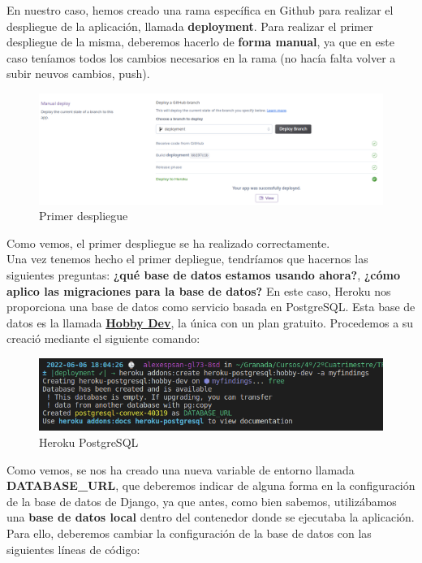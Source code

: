 En nuestro caso, hemos creado una rama específica en Github para realizar el despliegue de
la aplicación, llamada \textbf{deployment}. Para realizar el primer despliegue de la misma,
deberemos hacerlo de \textbf{forma manual}, ya que en este caso teníamos todos los cambios
necesarios en la rama (no hacía falta volver a subir neuvos cambios, push).\\

    \begin{figure}[H]
        \centering
        \includegraphics[scale=0.30]{imagenes/first-deploy.png}
        \caption{Primer despliegue}
        \label{fig:first-deploy}
    \end{figure}

Como vemos, el primer despliegue se ha realizado correctamente.\\


Una vez tenemos hecho el primer depliegue, tendríamos que hacernos las siguientes
preguntas: \textbf{¿qué base de datos estamos usando ahora?}, \textbf{¿cómo aplico las
migraciones para la base de datos?} En este caso, Heroku nos proporciona una base de
datos como servicio basada en PostgreSQL. Esta base de datos es la llamada
\href{https://elements.heroku.com/addons/heroku-postgresql}{\textbf{Hobby Dev}}, la única
con un plan gratuito. Procedemos a su creació mediante el siguiente comando:

    \begin{figure}[H]
        \centering
        \includegraphics[scale=0.50]{imagenes/heroku-postgresql.png}
        \caption{Heroku PostgreSQL}
        \label{fig:heroku-postgresql}
    \end{figure}

Como vemos, se nos ha creado una nueva variable de entorno llamada \textbf{DATABASE\_URL},
que deberemos indicar de alguna forma en la configuración de la base de datos de Django,
ya que antes, como bien sabemos, utilizábamos una \textbf{base de datos local} dentro del
contenedor donde se ejecutaba la aplicación. Para ello, deberemos cambiar la configuración
de la base de datos con las siguientes líneas de código:

